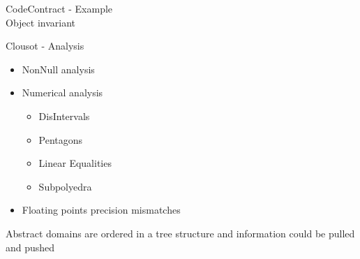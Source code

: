 \begin{frame}[fragile]{CodeContract - Example\\Object invariant}
\vspace*{-0.5cm}

\end{frame}



\begin{frame}{Clousot - Analysis}
\vspace*{-1cm}
\begin{itemize}
  \item NonNull analysis

  \vspace*{0.3cm}

  \item Numerical analysis
  \begin{itemize}
    \item DisIntervals
    \item Pentagons
    \item Linear Equalities
    \item Subpolyedra
  \end{itemize}

  \vspace*{0.3cm}

  \item Floating points precision mismatches

\end{itemize}

\vspace*{0.8cm}

Abstract domains are ordered in a tree structure and information could be
pulled and pushed

\end{frame}